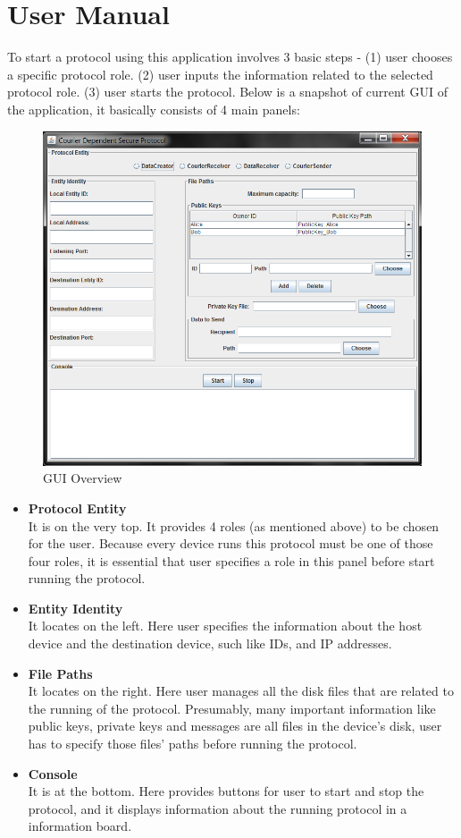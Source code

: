 \chapter{User Manual}
To start a protocol using this application involves 3 basic steps - (1) user chooses a specific protocol role. (2) user inputs the information related to the selected protocol role. (3) user starts the protocol. Below is a snapshot of current GUI of the application, it basically consists of 4 main panels:

\begin{figure}[h!]
\centering
\includegraphics[width=\textwidth,natwidth=818,natheight=722]{figures/guiall.png}
\caption{GUI Overview}
\end{figure}

\begin{itemize}
\item \textbf{Protocol Entity}\\
It is on the very top. It provides 4 roles (as mentioned above) to be chosen for the user. Because every device runs this protocol must be one of those four roles, it is essential that user specifies a role in this panel before start running the protocol.
\item \textbf{Entity Identity}\\
It locates on the left. Here user specifies the information about the host device and the destination device, such like IDs, and IP addresses.
\item \textbf{File Paths}\\
It locates on the right. Here user manages all the disk files that are related to the running of the protocol. Presumably, many important information like public keys, private keys and messages are all files in the device's disk, user has to specify those files' paths before running the protocol.
\item \textbf{Console}\\
It is at the bottom. Here provides buttons for user to start and stop the protocol, and it displays information about the running protocol in a information board.
\end{itemize}

